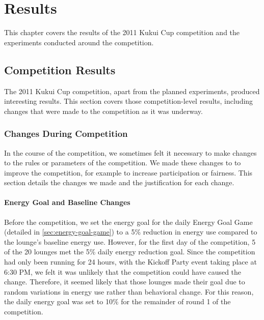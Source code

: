 \chapter{Results}
\label{cha:results}

This chapter covers the results of the 2011 Kukui Cup competition and the experiments conducted around the competition.


\section{Competition Results}

The 2011 Kukui Cup competition, apart from the planned experiments, produced interesting results. This section covers those competition-level results, including changes that were made to the competition as it was underway.


\subsection{Changes During Competition}

In the course of the competition, we sometimes felt it necessary to make changes to the rules or parameters of the competition. We made these changes to to improve the competition, for example to increase participation or fairness. This section details the changes we made and the justification for each change.


\subsubsection{Energy Goal and Baseline Changes}

Before the competition, we set the energy goal for the daily Energy Goal Game (detailed in \autoref{sec:energy-goal-game}) to a 5\% reduction in energy use compared to the lounge's baseline energy use. However, for the first day of the competition, 5 of the 20 lounges met the 5\% daily energy reduction goal. Since the competition had only been running for 24 hours, with the Kickoff Party event taking place at 6:30 PM, we felt it was unlikely that the competition could have caused the change. Therefore, it seemed likely that those lounges made their goal due to random variations in energy use rather than behavioral change. For this reason, the daily energy goal was set to 10\% for the remainder of round 1 of the competition.

